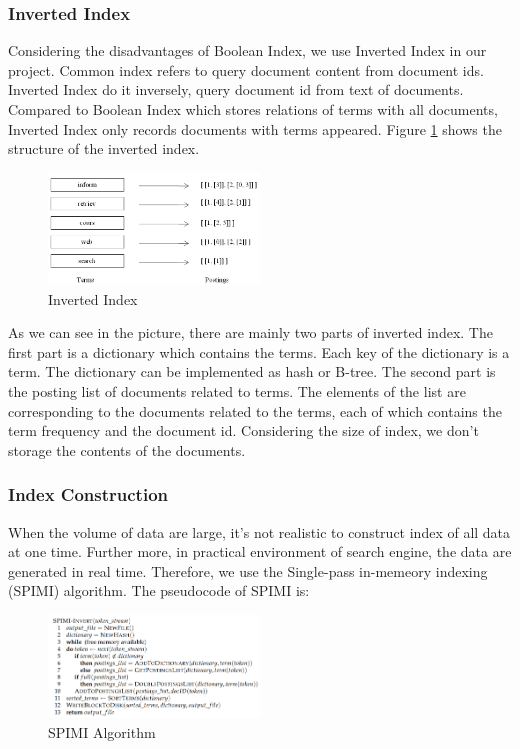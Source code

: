 \documentclass[10pt,journal,compsoc]{IEEEtran}
\begin{document}
\subsubsection{Inverted Index}
Considering the disadvantages of Boolean Index, we use Inverted Index in our project. Common index refers to query document content from document ids. Inverted Index do it inversely, query document id from text of documents. Compared to Boolean Index which stores relations of terms with all documents, Inverted Index only records documents with terms appeared. Figure \ref{fig:index} shows the structure of the inverted index.
\begin{figure}[H]
  \centering
    \includegraphics[width=0.5\textwidth]{images/inverted_index.png}
    \caption{Inverted Index}
    \label{fig:index}
\end{figure}
As we can see in the picture, there are mainly two parts of inverted index. The first part is a dictionary which contains the terms. Each key of the dictionary is a term. The dictionary can be implemented as hash or B-tree. The second part is the posting list of documents related to terms. The elements of the list are corresponding to the documents related to the terms, each of which contains the term frequency and the document id. Considering the size of index, we don't storage the contents of the documents. 

\subsubsection{Index Construction}
When the volume of data are large, it's not realistic to construct index of all data at one time. Further more, in practical environment of search engine, the data are generated in real time. Therefore, we use the Single-pass in-memeory indexing (SPIMI) algorithm. The pseudocode of SPIMI is:
\begin{figure}[H]
  \centering
    \includegraphics[width=0.5\textwidth]{images/SPIMI-algo.png}
    \caption{SPIMI Algorithm}
    \label{fig:spimi}
\end{figure}
\end{document}
